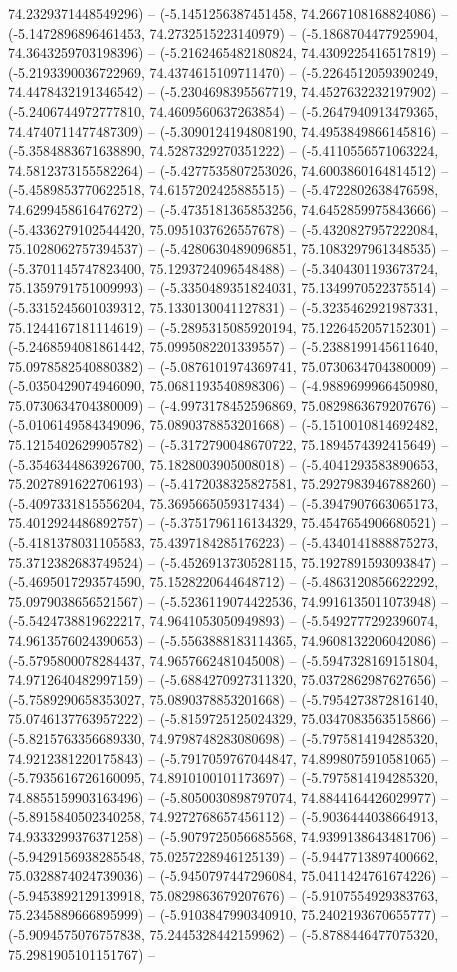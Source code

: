 74.2329371448549296) -- (-5.1451256387451458, 74.2667108168824086) -- (-5.1472896896461453, 74.2732515223140979) -- (-5.1868704477925904, 74.3643259703198396) -- (-5.2162465482180824, 74.4309225416517819) -- (-5.2193390036722969, 74.4374615109711470) -- (-5.2264512059390249, 74.4478432191346542) -- (-5.2304698395567719, 74.4527632232197902) -- (-5.2406744972777810, 74.4609560637263854) -- (-5.2647940913479365, 74.4740711477487309) -- (-5.3090124194808190, 74.4953849866145816) -- (-5.3584883671638890, 74.5287329270351222) -- (-5.4110556571063224, 74.5812373155582264) -- (-5.4277535807253026, 74.6003860164814512) -- (-5.4589853770622518, 74.6157202425885515) -- (-5.4722802638476598, 74.6299458616476272) -- (-5.4735181365853256, 74.6452859975843666) -- (-5.4336279102544420, 75.0951037626557678) -- (-5.4320827957222084, 75.1028062757394537) -- (-5.4280630489096851, 75.1083297961348535) -- (-5.3701145747823400, 75.1293724096548488) -- (-5.3404301193673724, 75.1359791751009993) -- (-5.3350489351824031, 75.1349970522375514) -- (-5.3315245601039312, 75.1330130041127831) -- (-5.3235462921987331, 75.1244167181114619) -- (-5.2895315085920194, 75.1226452057152301) -- (-5.2468594081861442, 75.0995082201339557) -- (-5.2388199145611640, 75.0978582540880382) -- (-5.0876101974369741, 75.0730634704380009) -- (-5.0350429074946090, 75.0681193540898306) -- (-4.9889699966450980, 75.0730634704380009) -- (-4.9973178452596869, 75.0829863679207676) -- (-5.0106149584349096, 75.0890378853201668) -- (-5.1510010814692482, 75.1215402629905782) -- (-5.3172790048670722, 75.1894574392415649) -- (-5.3546344863926700, 75.1828003905008018) -- (-5.4041293583890653, 75.2027891622706193) -- (-5.4172038325827581, 75.2927983946788260) -- (-5.4097331815556204, 75.3695665059317434) -- (-5.3947907663065173, 75.4012924486892757) -- (-5.3751796116134329, 75.4547654906680521) -- (-5.4181378031105583, 75.4397184285176223) -- (-5.4340141888875273, 75.3712382683749524) -- (-5.4526913730528115, 75.1927891593093847) -- (-5.4695017293574590, 75.1528220644648712) -- (-5.4863120856622292, 75.0979038656521567) -- (-5.5236119074422536, 74.9916135011073948) -- (-5.5424738819622217, 74.9641053050949893) -- (-5.5492777292396074, 74.9613576024390653) -- (-5.5563888183114365, 74.9608132206042086) -- (-5.5795800078284437, 74.9657662481045008) -- (-5.5947328169151804, 74.9712640482997159) -- (-5.6884270927311320, 75.0372862987627656) -- (-5.7589290658353027, 75.0890378853201668) -- (-5.7954273872816140, 75.0746137763957222) -- (-5.8159725125024329, 75.0347083563515866) -- (-5.8215763356689330, 74.9798748283080698) -- (-5.7975814194285320, 74.9212381220175843) -- (-5.7917059767044847, 74.8998075910581065) -- (-5.7935616726160095, 74.8910100101173697) -- (-5.7975814194285320, 74.8855159903163496) -- (-5.8050030898797074, 74.8844164426029977) -- (-5.8915840502340258, 74.9272768657456112) -- (-5.9036444038664913, 74.9333299376371258) -- (-5.9079725056685568, 74.9399138643481706) -- (-5.9429156938285548, 75.0257228946125139) -- (-5.9447713897400662, 75.0328874024739036) -- (-5.9450797447296084, 75.0411424761674226) -- (-5.9453892129139918, 75.0829863679207676) -- (-5.9107554929383763, 75.2345889666895999) -- (-5.9103847990340910, 75.2402193670655777) -- (-5.9094575076757838, 75.2445328442159962) -- (-5.8788446477075320, 75.2981905101151767) -- 